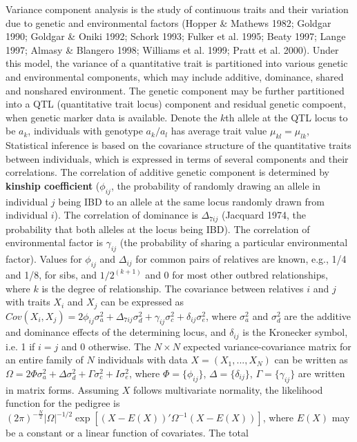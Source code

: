 Variance component analysis is the study of continuous traits and their
variation due to genetic and environmental factors (Hopper \& Mathews 1982;
Goldgar 1990; Goldgar \& Oniki 1992; Schork 1993; Fulker et al.  1995; Beaty
1997; Lange 1997; Almasy \& Blangero 1998; Williams et al.  1999; Pratt et al.
2000).  Under this model, the variance of a quantitative trait is partitioned
into various genetic and environmental components, which may include additive,
dominance, shared and nonshared environment.  The genetic component may be
further partitioned into a QTL (quantitative trait locus) component and
residual genetic compoent, when genetic marker data is available.  Denote the
$k$th allele at the QTL locus to be $a_k$, individuals with genotype $a_k/a_l$
has average trait value $\mu_{kl}=\mu_{lk}$, Statistical inference is based on
the covariance structure of the quantitative traits between individuals, which
is expressed in terms of several components and their correlations.  The
correlation of additive genetic component is determined by {\bf kinship
coefficient} ($\phi_{ij}$, the probability of randomly drawing an allele in
individual $j$ being IBD to an allele at the same locus randomly drawn from
individual $i$).  The correlation of dominance is $\Delta_{7ij}$ (Jacquard
1974, the probability that both alleles at the locus being IBD).  The
correlation of environmental factor is $\gamma_{ij}$ (the probability of
sharing a particular environmental factor).  Values for $\phi_{ij}$ and
$\Delta_{ij}$ for common pairs of relatives are known, e.g., 1/4 and 1/8, for
sibs, and $1/2^{(k+1)}$ and 0 for most other outbred relationships, where $k$
is the degree of relationship.  The covariance between relatives $i$ and $j$
with traits $X_i$ and $X_j$ can be expressed as
$Cov(X_i,X_j)=2\phi_{ij}\sigma_a^2
+\Delta_{7ij}\sigma_d^2+\gamma_{ij}\sigma_c^2+\delta_{ij} \sigma_e^2$, where
$\sigma_a^2$ and $\sigma_d^2$ are the additive and dominance effects of the
determining locus, and $\delta_{ij}$ is the Kronecker symbol, i.e.  1 if $i=j$
and 0 otherwise.  The $N\times N$ expected variance-covariance matrix for an
entire family of $N$ individuals with data $X=(X_1,...,X_N)$ can be written as
$ \Omega=2\Phi\sigma_a^2+\Delta\sigma_d^2+\Gamma\sigma_c^2+I \sigma_e^2$, where
$\Phi=\{\phi_{ij}\}$, $\Delta=\{\delta_{ij}\}$, $\Gamma=\{\gamma_{ij}\}$ are
written in matrix forms.  Assuming $X$ follows multivariate normality, the
likelihood function for the pedigree is
$(2\pi)^{-\frac{N}{2}}|\Omega|^{-1/2}\exp[(X-E(X))'\Omega^{-1}(X-E(X))]$,
where $E(X)$ may be a constant or a linear function of covariates.  The total
